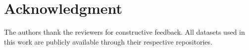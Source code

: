 \documentclass[10pt,conference]{IEEEtran}
\begin{document}
\section*{Acknowledgment}

The authors thank the reviewers for constructive feedback.  All datasets
used in this work are publicly available through their respective
repositories.



\end{document}
